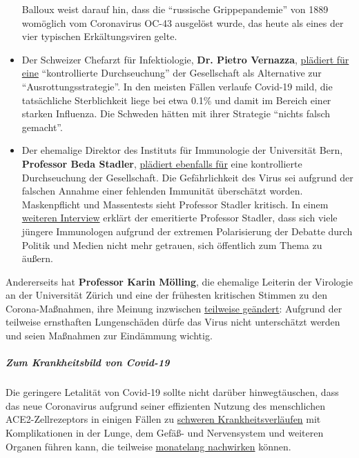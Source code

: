 \begin{itemize}
  Balloux weist darauf hin, dass die ``russische Grippepandemie'' von
  1889 womöglich vom Coronavirus OC-43 ausgelöst wurde, das heute als
  eines der vier typischen Erkältungsviren gelte.
\item
  Der Schweizer Chefarzt für Infektiologie, \textbf{Dr. Pietro
  Vernazza},
  \href{https://corona-transition.org/der-infektiologe-prof-pietro-vernazza-sieht-covid-19-im-bereich-einer}{plädiert
  für eine} ``kontrollierte Durchseuchung'' der Gesellschaft als
  Alternative zur ``Ausrottungsstrategie''. In den meisten Fällen
  verlaufe Covid-19 mild, die tatsächliche Sterblichkeit liege bei etwa
  0.1\% und damit im Bereich einer starken Influenza. Die Schweden
  hätten mit ihrer Strategie ``nichts falsch gemacht''.
\item
  Der ehemalige Direktor des Instituts für Immunologie der Universität
  Bern, \textbf{Professor Beda Stadler},
  \href{https://www.achgut.com/artikel/coronas_zeugen}{plädiert
  ebenfalls für} eine kontrollierte Durchseuchung der Gesellschaft. Die
  Gefährlichkeit des Virus sei aufgrund der falschen Annahme einer
  fehlenden Immunität überschätzt worden. Maskenpflicht und Massentests
  sieht Professor Stadler kritisch. In einem
  \href{https://www.youtube.com/watch?v=GBRcK-od50Q}{weiteren Interview}
  erklärt der emeritierte Professor Stadler, dass sich viele jüngere
  Immunologen aufgrund der extremen Polarisierung der Debatte durch
  Politik und Medien nicht mehr getrauen, sich öffentlich zum Thema zu
  äußern.
\end{itemize}

Andererseits hat \textbf{Professor Karin Mölling}, die ehemalige
Leiterin der Virologie an der Universität Zürich und eine der frühesten
kritischen Stimmen zu den Corona-Maßnahmen, ihre Meinung inzwischen
\href{https://www.bazonline.ch/eine-zweite-welle-laesst-sich-vermeiden-zumindest-bis-im-winter-959708338566}{teilweise
geändert}: Aufgrund der teilweise ernsthaften Lungenschäden dürfe das
Virus nicht unterschätzt werden und seien Maßnahmen zur Eindämmung
wichtig.

\hypertarget{zum-krankheitsbild-von-covid-19}{%
\subparagraph{\texorpdfstring{\textbf{Zum Krankheitsbild von
Covid-19}}{Zum Krankheitsbild von Covid-19}}\label{zum-krankheitsbild-von-covid-19}}

Die geringere Letalität von Covid-19 sollte nicht darüber
hinwegtäuschen, dass das neue Coronavirus aufgrund seiner effizienten
Nutzung des menschlichen ACE2-Zellrezeptors in einigen Fällen zu
\href{https://www.nature.com/articles/s41591-020-0968-3}{schweren
Krankheitsverläufen} mit Komplikationen in der Lunge, dem Gefäß- und
Nervensystem und weiteren Organen führen kann, die teilweise
\href{https://jamanetwork.com/journals/jama/fullarticle/2768351}{monatelang
nachwirken} können.

